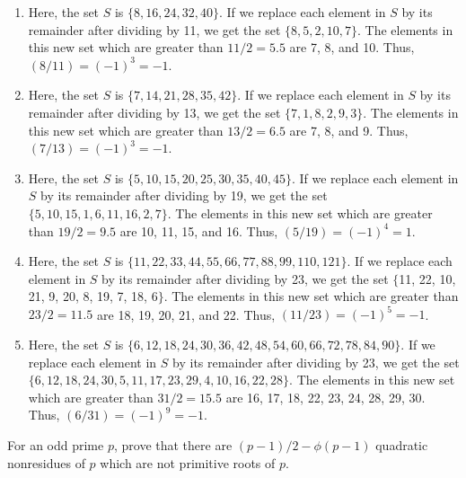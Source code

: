 \begin{solution}
    \begin{enumerate}
        \item Here, the set $S$ is $\{8, 16, 24, 32, 40\}$. If we replace each element in $S$ by its remainder after dividing by 11, we get the set $\{8, 5, 2, 10, 7\}$. The elements in this new set which are greater than $11/2 = 5.5$ are 7, 8, and 10. Thus, $(8/11) = (-1)^3 = -1$.
        \item Here, the set $S$ is $\{7, 14, 21, 28, 35, 42\}$. If we replace each element in $S$ by its remainder after dividing by 13, we get the set $\{7, 1, 8, 2, 9, 3\}$. The elements in this new set which are greater than $13/2 = 6.5$ are 7, 8, and 9. Thus, $(7/13) = (-1)^3 = -1$.
        \item Here, the set $S$ is $\{5, 10, 15, 20, 25, 30, 35, 40, 45\}$. If we replace each element in $S$ by its remainder after dividing by 19, we get the set $\{5, 10, 15, 1, 6, 11, 16, 2, 7\}$. The elements in this new set which are greater than $19/2 = 9.5$ are 10, 11, 15, and 16. Thus, $(5/19) = (-1)^4 = 1$.
        \item Here, the set $S$ is $\{11, 22, 33, 44, 55, 66, 77, 88, 99, 110, 121\}$. If we replace each element in $S$ by its remainder after dividing by 23, we get the set $\{$11, 22, 10, 21, 9, 20, 8, 19, 7, 18, 6$\}$. The elements in this new set which are greater than $23/2 = 11.5$ are 18, 19, 20, 21, and 22. Thus, $(11/23) = (-1)^5 = -1$.
        \item Here, the set $S$ is $\{6, 12, 18, 24, 30, 36, 42, 48, 54, 60, 66, 72, 78, 84, 90\}$. If we replace each element in $S$ by its remainder after dividing by 23, we get the set $\{6, 12, 18, 24, 30, 5, 11, 17, 23, 29, 4, 10, 16, 22, 28\}$. The elements in this new set which are greater than $31/2 = 15.5$ are 16, 17, 18, 22, 23, 24, 28, 29, 30. Thus, $(6/31) = (-1)^9 = -1$. \\
    \end{enumerate}
\end{solution}

\begin{exercise}
    For an odd prime $p$, prove that there are $(p-1)/2 - \phi(p-1)$ quadratic nonresidues of $p$ which are not primitive roots of $p$. \\
\end{exercise}

